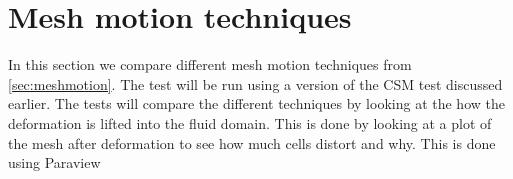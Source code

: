 \chapter{Mesh motion techniques}
In this section we compare different mesh motion techniques from \ref{sec:meshmotion}. The test will be run using a version of the CSM test discussed earlier. The tests will compare the different techniques by looking at the how the deformation is lifted into the fluid domain. This is done by looking at a plot of the mesh after deformation to see how much cells distort and why. This is done using Paraview